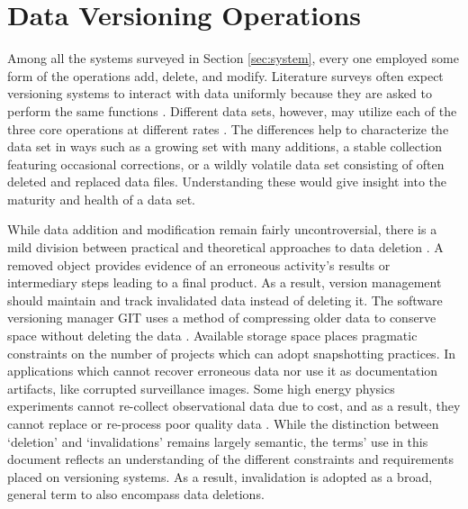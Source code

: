 \section{Data Versioning Operations}

Among all the systems surveyed in Section \ref{sec:system}, every one employed some form of the operations add, delete, and modify.
Literature surveys often expect versioning systems to interact with data uniformly because they are asked to perform the same functions \cite{Tagger2005}.
Different data sets, however, may utilize each of the three core operations at different rates \cite{rohtua}.
The differences help to characterize the data set in ways such as a growing set with many additions, a stable collection featuring occasional corrections, or a wildly volatile data set consisting of often deleted and replaced data files.
Understanding these would give insight into the maturity and health of a data set.

While data addition and modification remain fairly uncontroversial, there is a mild division between practical and theoretical approaches to data deletion \cite{Flouris04clotho:transparent}.
A removed object provides evidence of an erroneous activity's results or intermediary steps leading to a final product.
As a result, version management should maintain and track invalidated data instead of deleting it.
The software versioning manager GIT uses a method of compressing older data to conserve space without deleting the data \cite{Chacon:2009:PG:1618548}.
Available storage space places pragmatic constraints on the number of projects which can adopt snapshotting practices.
In applications which cannot recover erroneous data nor use it as documentation artifacts, like corrupted surveillance images.
Some high energy physics experiments cannot re-collect observational data due to cost, and as a result, they cannot replace or re-process poor quality data \cite{Cavanaugh2002}.
While the distinction between `deletion' and `invalidations' remains largely semantic, the terms' use in this document reflects an understanding of the different constraints and requirements placed on versioning systems.
As a result, invalidation is adopted as a broad, general term to also encompass data deletions.


